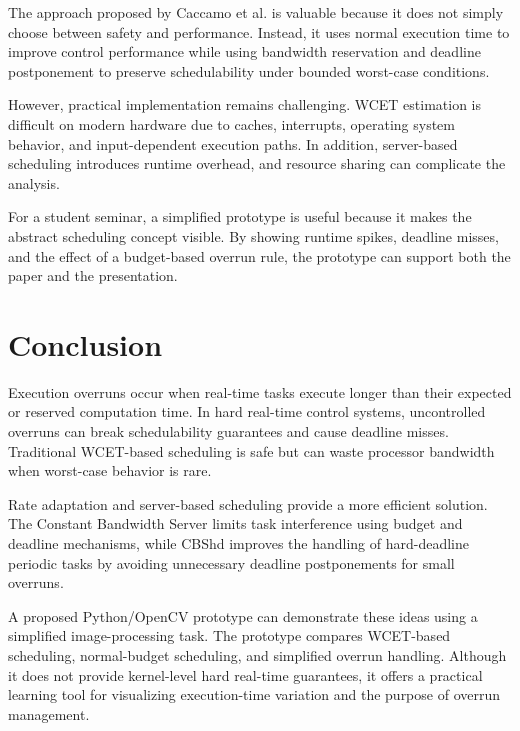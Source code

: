 \documentclass[conference]{IEEEtran}
\begin{document}
The approach proposed by Caccamo et al. is valuable because it does not simply choose between safety and performance. Instead, it uses normal execution time to improve control performance while using bandwidth reservation and deadline postponement to preserve schedulability under bounded worst-case conditions.

However, practical implementation remains challenging. WCET estimation is difficult on modern hardware due to caches, interrupts, operating system behavior, and input-dependent execution paths. In addition, server-based scheduling introduces runtime overhead, and resource sharing can complicate the analysis.

For a student seminar, a simplified prototype is useful because it makes the abstract scheduling concept visible. By showing runtime spikes, deadline misses, and the effect of a budget-based overrun rule, the prototype can support both the paper and the presentation.

\section{Conclusion}

Execution overruns occur when real-time tasks execute longer than their expected or reserved computation time. In hard real-time control systems, uncontrolled overruns can break schedulability guarantees and cause deadline misses. Traditional WCET-based scheduling is safe but can waste processor bandwidth when worst-case behavior is rare.

Rate adaptation and server-based scheduling provide a more efficient solution. The Constant Bandwidth Server limits task interference using budget and deadline mechanisms, while CBShd improves the handling of hard-deadline periodic tasks by avoiding unnecessary deadline postponements for small overruns.

A proposed Python/OpenCV prototype can demonstrate these ideas using a simplified image-processing task. The prototype compares WCET-based scheduling, normal-budget scheduling, and simplified overrun handling. Although it does not provide kernel-level hard real-time guarantees, it offers a practical learning tool for visualizing execution-time variation and the purpose of overrun management.
\end{document}
